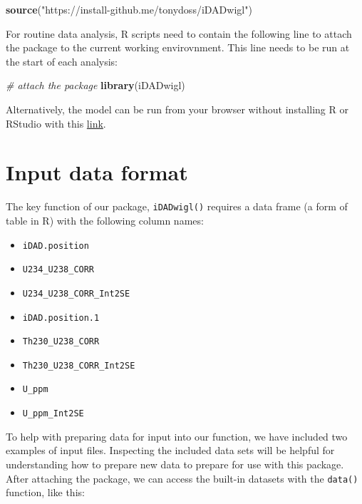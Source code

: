 \documentclass[]{elsarticle} %
\providecommand{\tightlist}{%
  \setlength{\itemsep}{0pt}\setlength{\parskip}{0pt}}
\newenvironment{Shaded}{\begin{snugshade}}{\end{snugshade}}
\newcommand{\CommentTok}[1]{\textcolor[rgb]{0.56,0.35,0.01}{\textit{#1}}}
\newcommand{\KeywordTok}[1]{\textcolor[rgb]{0.13,0.29,0.53}{\textbf{#1}}}
\newcommand{\NormalTok}[1]{#1}
\newcommand{\StringTok}[1]{\textcolor[rgb]{0.31,0.60,0.02}{#1}}
\begin{document}
\begin{Shaded}
\begin{Highlighting}[]
\KeywordTok{source}\NormalTok{(}\StringTok{"https://install-github.me/tonydoss/iDADwigl"}\NormalTok{)}
\end{Highlighting}
\end{Shaded}

For routine data analysis, R scripts need to contain the following line to attach the package to the current working envirovnment. This line needs to be run at the start of each analysis:

\begin{Shaded}
\begin{Highlighting}[]
\CommentTok{# attach the package}
\KeywordTok{library}\NormalTok{(iDADwigl)}
\end{Highlighting}
\end{Shaded}

Alternatively, the model can be run from your browser without installing R or RStudio with this \href{https://mybinder.org/v2/gh/benmarwick/iDADwigl/master?urlpath=rstudio}{link}.

\newpage

\hypertarget{input-data-format}{%
\section{Input data format}\label{input-data-format}}

The key function of our package, \texttt{iDADwigl()} requires a data frame (a form of table in R) with the following column names:

\begin{itemize}
\tightlist
\item
  \texttt{iDAD.position}
\item
  \texttt{U234\_U238\_CORR}
\item
  \texttt{U234\_U238\_CORR\_Int2SE}
\item
  \texttt{iDAD.position.1}
\item
  \texttt{Th230\_U238\_CORR}
\item
  \texttt{Th230\_U238\_CORR\_Int2SE}
\item
  \texttt{U\_ppm}
\item
  \texttt{U\_ppm\_Int2SE}
\end{itemize}

To help with preparing data for input into our function, we have included two examples of input files. Inspecting the included data sets will be helpful for understanding how to prepare new data to prepare for use with this package. After attaching the package, we can access the built-in datasets with the \texttt{data()} function, like this:
\end{document}

